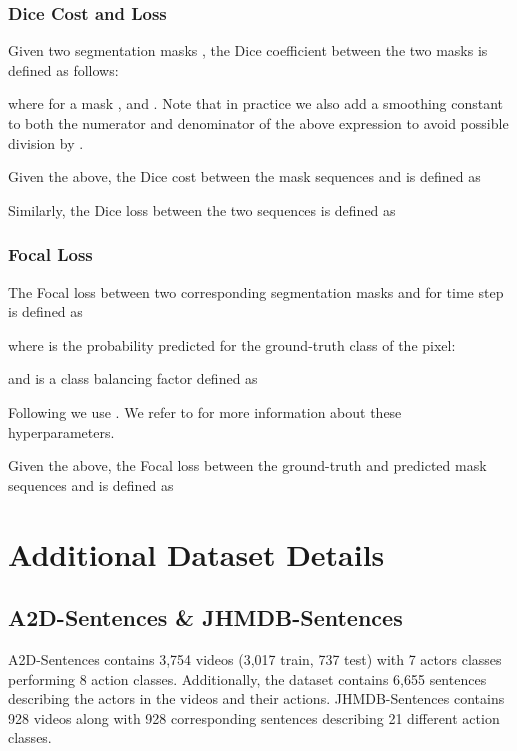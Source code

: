\documentclass[10pt,twocolumn,letterpaper]{article}
\renewcommand{\cite}[1]{\citep{#1}}
\begin{document}
\subsubsection{Dice Cost and Loss}
Given two segmentation masks , the Dice coefficient \cite{milletari2016vnet} between the two masks is defined as follows:

where for a mask ,  and . Note that in practice we also add a smoothing constant  to both the numerator and denominator of the above expression to avoid possible division by .

Given the above, the Dice cost  between the mask sequences  and  is defined as


Similarly, the Dice loss  between the two sequences is defined as


\subsubsection{Focal Loss}
The Focal loss \cite{lin2017focal} between two corresponding segmentation masks  and  for time step  is defined as

where  is the probability predicted for the ground-truth class of the  pixel:

and  is a class balancing factor defined as
 

Following \cite{lin2017focal, wang2021vistr} we use . We refer to \cite{lin2017focal} for more information about these hyperparameters.

Given the above, the Focal loss  between the ground-truth and predicted mask sequences  and  is defined as


\section{Additional Dataset Details}
\subsection{A2D-Sentences \& JHMDB-Sentences}
\label{appendix_a2d_jhmdb}
A2D-Sentences \cite{gavrilyuk2018a2d} contains 3,754 videos (3,017 train, 737 test) with 7 actors classes performing 8 action classes. Additionally, the dataset contains 6,655 sentences describing the actors in the videos and their actions. JHMDB-Sentences \cite{gavrilyuk2018a2d} contains 928 videos along with 928 corresponding sentences describing 21 different action classes. 
\end{document}
